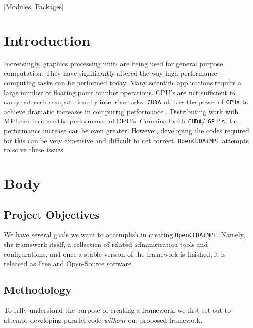 \documentclass{acm_proc_article-sp}
\begin{document}
[Modules, Packages]



\section{Introduction}

Increasingly, graphics processing units are being used for general purpose
computation. They have significantly altered the way high performance
computing tasks can be performed today. Many scientific applications require a
large number of floating point number operations. CPU's are not sufficient to
carry out such computationally intensive tasks.  \texttt{CUDA} utilizes the
power of \texttt{GPUs} to achieve dramatic increases in computing performance
\cite{website:cudaCProgrammingGuide}. Distributing work with MPI can increase
the performance of CPU's. Combined with \texttt{CUDA}/ \texttt{GPU's}, the
performance increase can be even greater.  However, developing the codes
required for this can be very expensive and difficult to get correct.
\texttt{OpenCUDA+MPI} attempts to solve these issues.

\section{Body}

\subsection{Project Objectives}

We have several goals we want to accomplish in creating \texttt{OpenCUDA+MPI}.
Namely, the framework itself, a collection of related administration tools and
configurations, and once a stable version of the framework is finished, it is
released as Free and Open-Source software.

\subsection{Methodology}

To fully understand the purpose of creating a framework, we first set out to
attempt developing parallel code \emph{without} our proposed framework.
\end{document}
